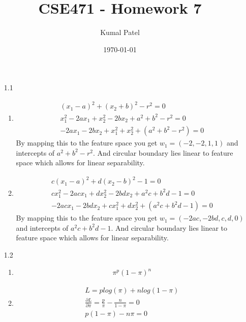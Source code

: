 \documentclass[letterpaper, 12pt]{article}
\title{CSE471 - Homework 7}
\author{Kumal Patel}
\date{\today}
\begin{document}
\maketitle

\begin{enumerate}
    \item[1.1]
        \begin{enumerate}
            \item
                  \begin{gather*}
                      (x_1-a)^2+(x_2+b)^2-r^2=0 \\
                      x_1^2-2ax_1+x_2^2-2bx_2+a^2+b^2-r^2 = 0\\
                      -2ax_1-2bx_2+x_1^2+x_2^2+(a^2+b^2-r^2) = 0
                  \end{gather*}
                  By mapping this to the feature space you get $w_1=(-2,-2,1,1)$
                  and intercepts of $a^2+b^2-r^2$. And circular boundary lies
                  linear to feature space which allows for linear separability.
            \item
                  \begin{gather*}
                      c(x_1-a)^2+d(x_2-b)^2-1=0 \\
                      cx_1^2-2acx_1+dx_2^2-2bdx_2+a^2c+b^2d-1=0 \\
                      -2acx_1-2bdx_2+cx_1^2+dx_2^2+(a^2c+b^2d-1)=0
                  \end{gather*}
                  By mapping this to the feature space you get $w_1=(-2ac,-2bd,c,d,0)$
                  and intercepts of $a^2c+b^2d-1$. And circular boundary lies linear to
                  feature space which allows for linear separability.
        \end{enumerate}
    \item[1.2]
        \begin{enumerate}
            \item
                  \begin{gather*}
                      \pi^p(1-\pi)^n
                  \end{gather*}
            \item
                  \begin{gather*}
                      L = plog(\pi) + nlog(1-\pi) \\
                      \frac{\partial L}{\partial \pi}= \frac{p}{\pi}-\frac{n}{1-\pi}=0 \\
                      p(1-\pi) - n\pi = 0 \\

\end{gather*}
\end{enumerate}
\end{enumerate}
\end{document}
